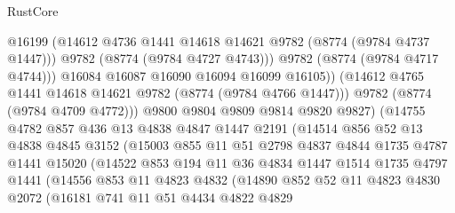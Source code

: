 \begin{lexlean}{RustCore}
\begin{coremodule}
                              @16199
                              (@14612 @4736 @1441 @14618 @14621 @9782 (@8774 (@9784 @4737 @1447)))
                              @9782
                              (@8774 (@9784 @4727 @4743)))
                            @9782
                            (@8774 (@9784 @4717 @4744)))
                          @16084
                          @16087
                          @16090
                          @16094
                          @16099
                          @16105))
                      (@14612 @4765 @1441 @14618 @14621 @9782 (@8774 (@9784 @4766 @1447)))
                      @9782
                      (@8774 (@9784 @4709 @4772)))
                    @9800
                    @9804
                    @9809
                    @9814
                    @9820
                    @9827)
                  (@14755
                    @4782
                    @857
                    @436
                    @13
                    @4838
                    @4847
                    @1447
                    @2191
                    (@14514
                      @856
                      @52
                      @13
                      @4838
                      @4845
                      @3152
                      (@15003
                        @855
                        @11
                        @51
                        @2798
                        @4837
                        @4844
                        @1735
                        @4787
                        @1441
                        @15020
                        (@14522
                          @853
                          @194
                          @11
                          @36
                          @4834
                          @1447
                          @1514
                          @1735
                          @4797
                          @1441
                          (@14556
                            @853
                            @11
                            @4823
                            @4832
                            (@14890
                              @852
                              @52
                              @11
                              @4823
                              @4830
                              @2072
                              (@16181
                                @741
                                @11
                                @51
                                @4434
                                @4822
                                @4829

\end{coremodule}
\end{lexlean}
